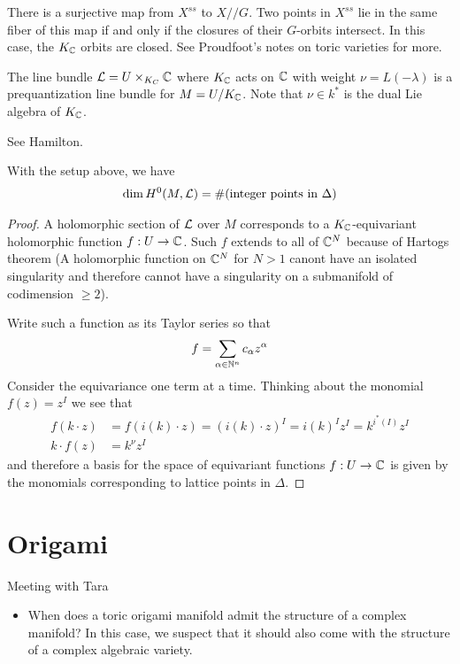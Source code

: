 \documentclass[12pt]{article}
\begin{document}
\begin{remark}
    There is a surjective map from $X^{ss}$ to $X//G$. Two points in $X^{ss}$ lie in the same fiber of this map if and only if the closures of their 
    $G$-orbits intersect. In this case, the $K_{\mathbb{C}}$ orbits are closed. See Proudfoot's notes on toric varieties for more.
\end{remark}

\begin{proposition}
    The line bundle ${\mathcal{L}} = U \times_{K_C} \mathbb{C}$ where $K_{\mathbb{C}}$ acts on $\mathbb{C}$ with 
    weight $\nu = L(-\lambda)$ is a prequantization line bundle for $M = U/K_{\mathbb{C}}$. Note that $\nu \in k^*$ is the 
    dual Lie algebra of $K_{\mathbb{C}}$.
\end{proposition}

See Hamilton.

\begin{theorem}
    With the setup above, we have \begin{align*}
        \dim H^0(M,{\mathcal{L}}) = \#(\text{integer points in }\Delta)
    \end{align*}
\end{theorem}

\begin{proof}
    A holomorphic section of ${\mathcal{L}}$ over $M$ corresponds to a $K_{\mathbb{C}}$-equivariant holomorphic function $f:U\to \mathbb{C}$. 
    Such $f$ extends to all of $\mathbb{C}^N$ because of Hartogs theorem (A holomorphic function on $\mathbb{C}^N$ for $N>1$ canont have 
    an isolated singularity and therefore cannot have a singularity on a submanifold of codimension $\geq 2$).

    \hfill

    Write such a function as its Taylor series so that \begin{align*}
        f = \sum_{\alpha\in\mathbb{N}^n} c_\alpha z^\alpha
    \end{align*} Consider the equivariance one term at a time. 
    Thinking about the monomial $f(z) = z^I$ we 
    see that \begin{align*}
        f(k\cdot z) &= f(i(k)\cdot z) = (i(k)\cdot z)^I = i(k)^Iz^I = k^{i^*(I)}z^I \\
        k\cdot f(z) &= k^{\nu}z^I
    \end{align*} and therefore a basis for the space of equivariant functions $f:U\to \mathbb{C}$ 
    is given by the monomials corresponding to lattice points in $\Delta$.
\end{proof}

\section{Origami}
Meeting with Tara
\begin{itemize}
    \item When does a toric origami manifold admit the structure of a complex manifold?
    In this case, we suspect that it should also come with the structure of a complex 
    algebraic variety. 
\end{itemize}
\end{document}

